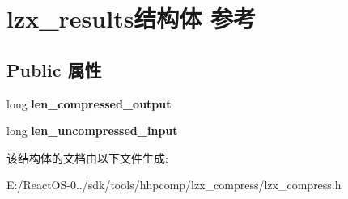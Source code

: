 \hypertarget{structlzx__results}{}\section{lzx\+\_\+results结构体 参考}
\label{structlzx__results}
\subsection*{Public 属性}
\begin{DoxyCompactItemize}
\item 
\mbox{\label{structlzx__results_a316b0991bff850eb9e9746b9ac71ab12}} 
long {\bfseries len\+\_\+compressed\+\_\+output}
\item 
\mbox{\label{structlzx__results_a80b77f70b06eb4932f97212fd2bcf496}} 
long {\bfseries len\+\_\+uncompressed\+\_\+input}
\end{DoxyCompactItemize}


该结构体的文档由以下文件生成\+:\begin{DoxyCompactItemize}
\item 
E\+:/\+React\+O\+S-\/0../sdk/tools/hhpcomp/lzx\+\_\+compress/lzx\+\_\+compress.\+h\end{DoxyCompactItemize}
